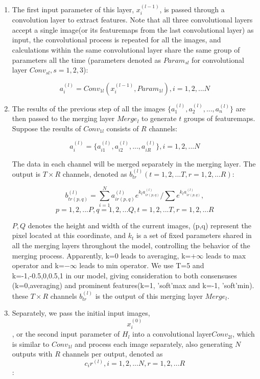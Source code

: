 
\begin{enumerate}
\item The first input parameter of this layer, $x_i^{(l-1)}$, is passed through a convolution layer to extract features. Note that all three convolutional layers accept a single image(or its featuremaps from the last convolutional layer) as input, the convolutional process is repeated for all the images, and calculations within the same convolutional layer share the same group of parameters all the time (parameters denoted as $Param_{sl}$ for convolutional layer $Conv_{sl}, s=1,2,3$):

$$ a_i^{(l)} = Conv_{1l}(x_i^{(l-1)},Param_{1l}), i=1,2,...N$$

\item The results of the previous step of all the images $\{a_1^{(l)},a_2^{(l)},...,a_n^{(l)}\}$ are then passed to the merging layer $Merge_l$ to generate $t$ groups of featuremaps. Suppose the results of $Conv_{1l}$ consists of $R$ channels:

$$ a_i^{(l)} = \{a_{i1}^{(l)},a_{i2}^{(l)},...,a_{iR}^{(l)}\}, i=1,2,...N$$

The data in each channel will be merged separately in the merging layer. The output is $T\times R$ channels, denoted as $b_{tr}^{(l)}(t=1,2,...T, r=1,2,...R)$:

$$ b_{tr(p,q)}^{(l)} = \sum_{i=1}^{N} a_{ir(p,q)}^{(l)} e^{k_t a_{ir(p,q)}^{(l)}} /\sum e^{k_t a_{ir(p,q)}^{(l)}},$$
$$ p=1,2,...P, q=1,2,...Q, t=1,2,...T, r=1,2,...R $$

$P,Q$ denotes the height and width of the current images, (p,q) represent the pixel located at this coordinate, and $k_t$ is a set of fixed parameters shared in all the merging layers throughout the model, controlling the behavior of the merging process. Apparently, k=0 leads to averaging, k=${+\infty}$ leads to max operator and k=${-\infty}$ leads to min operator. We use T=5 and k=-1,-0.5,0,0.5,1 in our model, giving consideration to both consensuses (k=0,averaging) and prominent features(k=1, 'soft'max and k=-1, 'soft'min). these $T\times R$ channels $b_{tr}^{(l)}$ is the output of this merging layer $Merge_l$.

\item Separately, we pass the initial input images, $$x_i^{(0)}$$, or the second input parameter of $H_l$ into a convolutional layer$Conv_{2l}$, which is similar to $Conv_{1l}$ and process each image separately, also generating $N$ outputs with $R$ channels per output, denoted as $$c_ir^{(l)}, i=1,2,...N, r=1,2,...R$$:


\end{enumerate}
